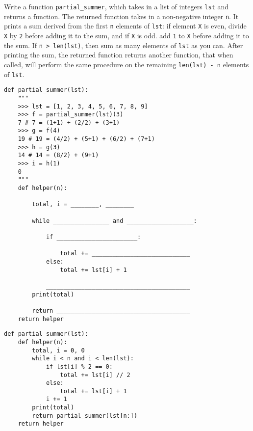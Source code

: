 \begin{blocksection}
\question Write a function \lstinline{partial_summer}, which takes in a list of integers \lstinline{lst} and returns a function. The returned function takes in a non-negative integer \lstinline{n}. It prints a sum derived from the first \lstinline{n} elements of \lstinline{lst}: if element \texttt{X} is even, divide \texttt{X} by \lstinline{2} before adding it to the sum, and if \texttt{X} is odd. add \lstinline{1} to \texttt{X} before adding it to the sum. If \lstinline{n > len(lst)}, then sum as many elements of \lstinline{lst} as you can. After printing the sum, the returned function returns another function, that when called, will perform the same procedure on the remaining \lstinline{len(lst) - n} elements of \lstinline{lst}. \\

\begin{lstlisting}
def partial_summer(lst):
    """
    >>> lst = [1, 2, 3, 4, 5, 6, 7, 8, 9]
    >>> f = partial_summer(lst)(3)
    7 # 7 = (1+1) + (2/2) + (3+1)
    >>> g = f(4)
    19 # 19 = (4/2) + (5+1) + (6/2) + (7+1)
    >>> h = g(3)
    14 # 14 = (8/2) + (9+1)
    >>> i = h(1)
    0	
    """
    def helper(n):

        total, i = ________, ________

        while ________________ and ___________________:

            if _______________________:

                total += ____________________________
            else:
                total += lst[i] + 1
            
            _________________________________________
        print(total)

        return ______________________________________
    return helper
\end{lstlisting}
\end{blocksection}
\begin{blocksection}
\begin{solution}
\begin{lstlisting}
def partial_summer(lst):
    def helper(n):
        total, i = 0, 0
        while i < n and i < len(lst):
            if lst[i] % 2 == 0:
                total += lst[i] // 2
            else:
                total += lst[i] + 1
            i += 1
        print(total)
        return partial_summer(lst[n:])
    return helper
\end{lstlisting}
\end{solution}
\end{blocksection}